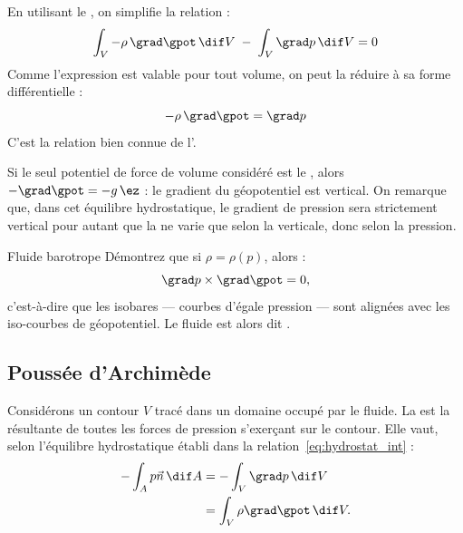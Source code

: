 En utilisant le , on simplifie la relation :
\begin{equation}
  \int_V - \rho \, \grad \gpot \, \dif V \; - \; \int_V \grad p \, \dif V = 0
  \label{eq:hydrostat_gauss}
\end{equation}
Comme l’expression est valable pour tout volume, on peut la réduire à sa forme différentielle :
\begin{equation}
  - \rho \, \grad \gpot = \grad p
  \label{eq:hydrostat_diff}
\end{equation}
C’est la relation bien connue de l’.

Si le seul potentiel de force de volume considéré est le , alors $-\grad \gpot = - g \, \ez$ : le gradient du géopotentiel est vertical. On remarque que, dans cet équilibre hydrostatique, le gradient de pression sera strictement vertical pour autant que la  ne varie que selon la verticale, donc selon la pression.

\begin{studentinvestigation}{Fluide barotrope}
Démontrez que si $\rho = \rho(p)$, alors :
\begin{equation}
  \grad p \times \grad \gpot = 0,
  \label{eq:barotrope}
\end{equation}
c’est-à-dire que les isobares --- courbes d'égale pression --- sont alignées avec les iso-courbes de géopotentiel. Le fluide est alors dit .
\end{studentinvestigation}

\subsection{Poussée d'Archimède}
Considérons un contour $V$ tracé dans un domaine occupé par le fluide.
La  est la résultante de toutes les forces de pression s'exerçant sur le contour. Elle vaut, selon l'équilibre hydrostatique établi dans la relation~\eqref{eq:hydrostat_int} :
\begin{displaymath}
  \begin{split}
    - \int_A p \vec{n}\, \dif A &= - \int_V \grad p\, \dif V  \\
                                &= \int_V \rho \grad \gpot\, \dif V.
  \end{split}
\end{displaymath}

